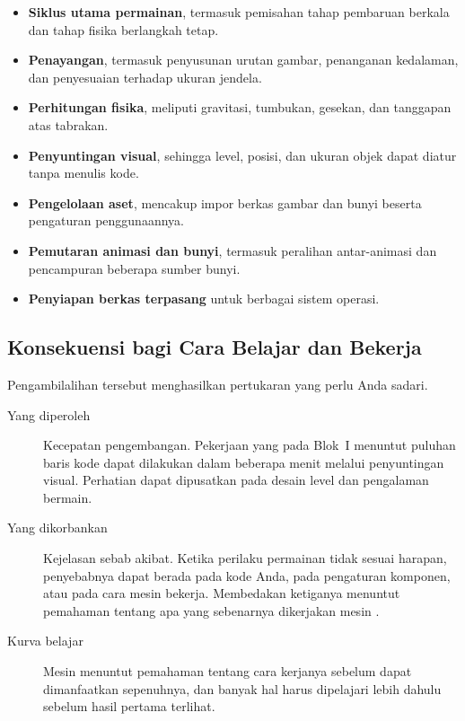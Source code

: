 \begin{itemize}
  \item \textbf{Siklus utama permainan}, termasuk pemisahan tahap pembaruan
        berkala dan tahap fisika berlangkah tetap.
  \item \textbf{Penayangan}, termasuk penyusunan urutan gambar, penanganan
        kedalaman, dan penyesuaian terhadap ukuran jendela.
  \item \textbf{Perhitungan fisika}, meliputi gravitasi, tumbukan, gesekan, dan
        tanggapan atas tabrakan.
  \item \textbf{Penyuntingan visual}, sehingga level, posisi, dan ukuran objek
        dapat diatur tanpa menulis kode.
  \item \textbf{Pengelolaan aset}, mencakup impor berkas gambar dan bunyi
        beserta pengaturan penggunaannya.
  \item \textbf{Pemutaran animasi dan bunyi}, termasuk peralihan antar-animasi
        dan pencampuran beberapa sumber bunyi.
  \item \textbf{Penyiapan berkas terpasang} untuk berbagai sistem operasi.
\end{itemize}

\subsection{Konsekuensi bagi Cara Belajar dan Bekerja}

Pengambilalihan tersebut menghasilkan pertukaran yang perlu Anda sadari.

\begin{description}
  \item[Yang diperoleh] Kecepatan pengembangan. Pekerjaan yang pada Blok~I
        menuntut puluhan baris kode dapat dilakukan dalam beberapa menit
        melalui penyuntingan visual. Perhatian dapat dipusatkan pada desain
        level dan pengalaman bermain.
  \item[Yang dikorbankan] Kejelasan sebab akibat. Ketika perilaku permainan
        tidak sesuai harapan, penyebabnya dapat berada pada kode Anda, pada
        pengaturan komponen, atau pada cara mesin bekerja. Membedakan
        ketiganya menuntut pemahaman tentang apa yang sebenarnya dikerjakan
        mesin \cite{unity-leveldesign}.
  \item[Kurva belajar] Mesin menuntut pemahaman tentang cara kerjanya sebelum
        dapat dimanfaatkan sepenuhnya, dan banyak hal harus dipelajari lebih
        dahulu sebelum hasil pertama terlihat.
\end{description}

